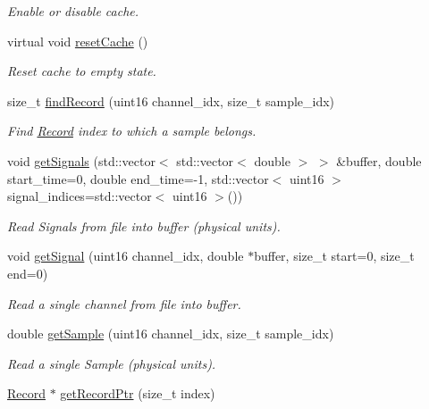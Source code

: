 \begin{DoxyCompactItemize}
\begin{DoxyCompactList}\small\item\em Enable or disable cache. \item\end{DoxyCompactList}\item 
\hypertarget{classgdf_1_1_reader_ac27a7669548fce17720b2f9c61dcfc05}{
virtual void \hyperlink{classgdf_1_1_reader_ac27a7669548fce17720b2f9c61dcfc05}{resetCache} ()}
\label{classgdf_1_1_reader_ac27a7669548fce17720b2f9c61dcfc05}

\begin{DoxyCompactList}\small\item\em Reset cache to empty state. \item\end{DoxyCompactList}\item 
\hypertarget{classgdf_1_1_reader_a9178f346903ee5f9b47932f7208e7dfa}{
size\_\-t \hyperlink{classgdf_1_1_reader_a9178f346903ee5f9b47932f7208e7dfa}{findRecord} (uint16 channel\_\-idx, size\_\-t sample\_\-idx)}
\label{classgdf_1_1_reader_a9178f346903ee5f9b47932f7208e7dfa}

\begin{DoxyCompactList}\small\item\em Find \hyperlink{classgdf_1_1_record}{Record} index to which a sample belongs. \item\end{DoxyCompactList}\item 
void \hyperlink{classgdf_1_1_reader_ad1b1edc464cfe23b54c9ffc278677087}{getSignals} (std::vector$<$ std::vector$<$ double $>$ $>$ \&buffer, double start\_\-time=0, double end\_\-time=-\/1, std::vector$<$ uint16 $>$ signal\_\-indices=std::vector$<$ uint16 $>$())
\begin{DoxyCompactList}\small\item\em Read Signals from file into buffer (physical units). \item\end{DoxyCompactList}\item 
void \hyperlink{classgdf_1_1_reader_a2ad79c0649034f6462052ba088850c97}{getSignal} (uint16 channel\_\-idx, double $\ast$buffer, size\_\-t start=0, size\_\-t end=0)
\begin{DoxyCompactList}\small\item\em Read a single channel from file into buffer. \item\end{DoxyCompactList}\item 
double \hyperlink{classgdf_1_1_reader_ab0c56ba1256f76ac62663bd634fac79f}{getSample} (uint16 channel\_\-idx, size\_\-t sample\_\-idx)
\begin{DoxyCompactList}\small\item\em Read a single Sample (physical units). \item\end{DoxyCompactList}\item 
\hypertarget{classgdf_1_1_reader_aa0e1f6e08f7eee1627f0c42b05210649}{
\hyperlink{classgdf_1_1_record}{Record} $\ast$ \hyperlink{classgdf_1_1_reader_aa0e1f6e08f7eee1627f0c42b05210649}{getRecordPtr} (size\_\-t index)}
\label{classgdf_1_1_reader_aa0e1f6e08f7eee1627f0c42b05210649}


\end{DoxyCompactItemize}
